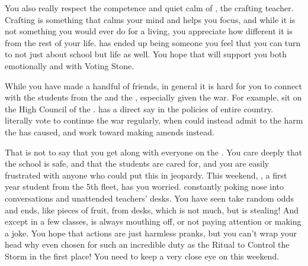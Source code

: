 \documentclass[char]{GL2020}
\begin{document}
You also really respect the competence and quiet calm of \cPirate{\full}, the crafting teacher. Crafting is something that calms your mind and helps you focus, and while it is not something you would ever do for a living, you appreciate how different it is from the rest of your life. \cPirate{} has ended up being someone you feel that you can turn to not just about school but life as well. You hope that \cPirate{\they} will support you both emotionally and with \cPirate{\their} Voting Stone.  

While you have made a handful of friends, in general it is hard for you to connect with the students from the \pTech{} and the \pFarm{}, especially given the war. For example, \cTechStar{\full} sit\cTechStar{\verbs} on the High Council of the \pTech{}. \cTechStar{} has a direct say in the policies of \cTechStar{\their} entire country. \cTechStar{\They} literally vote\cTechStar{\verbs} to continue the war regularly, when \cTechStar{\they} could instead admit to the harm the \pTech{} has caused, and work toward making amends instead. 

That is not to say that you get along with everyone on the \pShip{}. You care deeply that the school is safe, and that the students are cared for, and you are easily frustrated with anyone who could put this in jeopardy. This weekend, \cPirateChild{\full}, a first year student from the 5th fleet, has you worried. \cPirateChild{\Theyare} constantly poking \cPirateChild{\their} nose into conversations and unattended teachers’ desks. You have seen \cPirateChild{\them} take random odds and ends, like pieces of fruit, from desks, which is not much, but is stealing! And except in a few classes, \cPirateChild{} is always mouthing off, or not paying attention or making a joke. You hope that \cPirateChild{\their} actions are just harmless pranks, but you can’t wrap your head why \cPirateChild{\theywere} even chosen for such an incredible duty as the Ritual to Control the Storm in the first place! You need to keep a very close eye on \cPirateChild{\them} this weekend.
\end{document}
